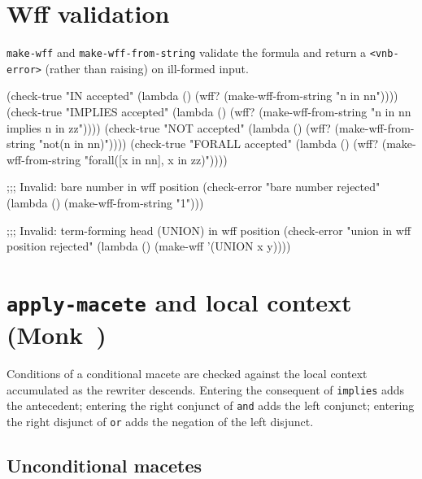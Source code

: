 \section{Wff validation}

\begin{sloppypar}\texttt{make-wff} and \texttt{make-wff-from-string} validate the formula
and return a \texttt{<vnb-error>} (rather than raising) on
ill-formed input.\end{sloppypar}

\begin{VNBcode}
(check-true  "IN accepted"      (lambda () (wff? (make-wff-from-string
                                                   "n in nn"))))
(check-true  "IMPLIES accepted" (lambda () (wff? (make-wff-from-string
                                                   "n in nn implies n in zz"))))
(check-true  "NOT accepted"     (lambda () (wff? (make-wff-from-string
                                                   "not(n in nn)"))))
(check-true  "FORALL accepted"  (lambda () (wff? (make-wff-from-string
                                                   "forall([x in nn], x in zz)"))))

;;; Invalid: bare number in wff position
(check-error "bare number rejected"
             (lambda () (make-wff-from-string "1")))

;;; Invalid: term-forming head (UNION) in wff position
(check-error "union in wff position rejected"
             (lambda () (make-wff '(UNION x y))))
\end{VNBcode}

\section[\texttt{apply-macete} and local context (Monk 1988)]{\texttt{apply-macete} and local context (Monk~\cite{Monk1988})}

Conditions of a conditional macete are checked against the local
context accumulated as the rewriter descends.  Entering the
consequent of \texttt{implies} adds the antecedent; entering the
right conjunct of \texttt{and} adds the left conjunct; entering the
right disjunct of \texttt{or} adds the negation of the left disjunct.

\subsection*{Unconditional macetes}


